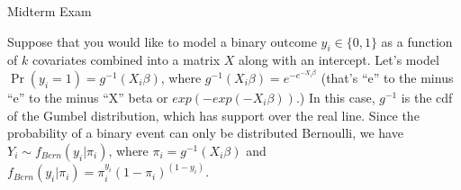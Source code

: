 \documentclass[10pt]{exam2}
\begin{document}
\begin{center}
{\LARGE Midterm Exam}\\\vspace{2mm}
\vspace{2mm}
\end{center}

\begin{questions}
\question Suppose that you would like to model a binary outcome $y_i \in \{0, 1\}$ as a function of $k$ covariates combined into a matrix $X$ along with an intercept. Let's model $\Pr(y_i = 1) = g^{-1}(X_i\beta)$, where $\displaystyle g^{-1}(X_i\beta) = e^{-e^{-X_i\beta}}$ (that's ``e'' to the minus ``e'' to the minus ``X'' beta or $exp(-exp(-X_i \beta))$.) In this case, $g^{-1}$ is the cdf of the Gumbel distribution, which has support over the real line. Since the probability of a binary event can only be distributed Bernoulli, we have $Y_i \sim f_{Bern}(y_i | \pi_i)$, where $\pi_i = g^{-1}(X_i\beta)$ and $f_{Bern}(y_i | \pi_i) = \pi_i^{y_i}(1 - \pi_i)^{(1 - y_i)}$.

\end{questions}
\end{document}
